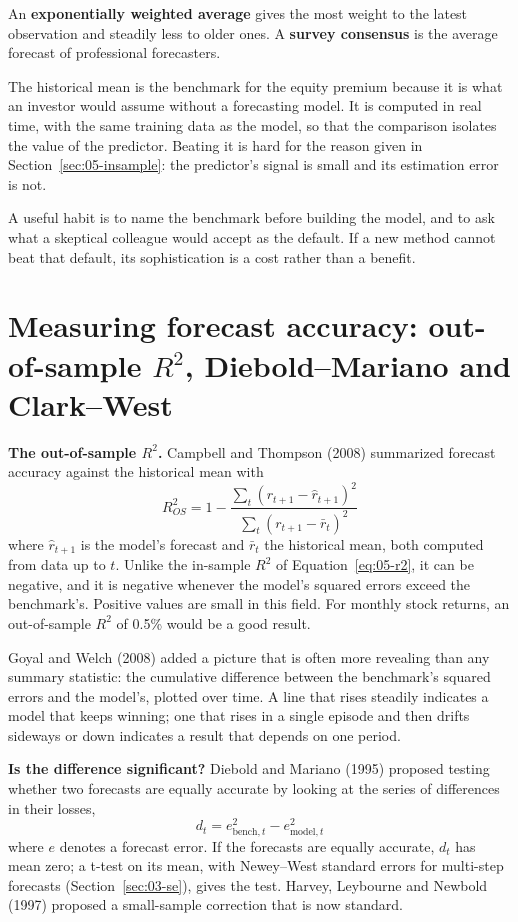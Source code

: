 An \textbf{exponentially weighted average} gives the most weight to the latest observation and steadily less to older ones. A \textbf{survey consensus} is the average forecast of professional forecasters.

The historical mean is the benchmark for the equity premium because it is what an investor would assume without a forecasting model. It is computed in real time, with the same training data as the model, so that the comparison isolates the value of the predictor. Beating it is hard for the reason given in Section~\ref{sec:05-insample}: the predictor's signal is small and its estimation error is not.

A useful habit is to name the benchmark before building the model, and to ask what a skeptical colleague would accept as the default. If a new method cannot beat that default, its sophistication is a cost rather than a benefit.

\section{Measuring forecast accuracy: out-of-sample $R^2$, Diebold--Mariano and Clark--West}
\label{sec:05-accuracy}

\textbf{The out-of-sample $R^2$.} Campbell and Thompson (2008) summarized forecast accuracy against the historical mean with
\begin{equation}
  R^2_{OS} = 1 - \frac{\sum_t (r_{t+1} - \hat r_{t+1})^2}{\sum_t (r_{t+1} - \bar r_{t})^2}
  \label{eq:05-r2os}
\end{equation}
where $\hat r_{t+1}$ is the model's forecast and $\bar r_t$ the historical mean, both computed from data up to $t$. Unlike the in-sample $R^2$ of Equation~\eqref{eq:05-r2}, it can be negative, and it is negative whenever the model's squared errors exceed the benchmark's. Positive values are small in this field. For monthly stock returns, an out-of-sample $R^2$ of 0.5\% would be a good result.

Goyal and Welch (2008) added a picture that is often more revealing than any summary statistic: the cumulative difference between the benchmark's squared errors and the model's, plotted over time. A line that rises steadily indicates a model that keeps winning; one that rises in a single episode and then drifts sideways or down indicates a result that depends on one period.

\textbf{Is the difference significant?} Diebold and Mariano (1995) proposed testing whether two forecasts are equally accurate by looking at the series of differences in their losses,
\begin{equation}
  d_t = e^2_{\text{bench},t} - e^2_{\text{model},t}
  \label{eq:05-dm}
\end{equation}
where $e$ denotes a forecast error. If the forecasts are equally accurate, $d_t$ has mean zero; a t-test on its mean, with Newey--West standard errors for multi-step forecasts (Section~\ref{sec:03-se}), gives the test. Harvey, Leybourne and Newbold (1997) proposed a small-sample correction that is now standard.

